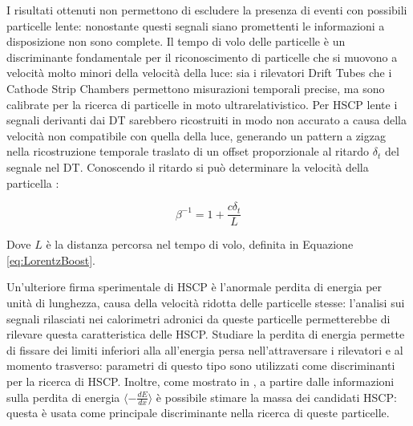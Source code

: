 
I risultati ottenuti non permettono di escludere la presenza di eventi con possibili particelle lente: nonostante questi segnali siano promettenti le informazioni a disposizione non sono complete. Il tempo di volo delle particelle è un discriminante fondamentale per il riconoscimento di particelle che si muovono a velocità molto minori della velocità della luce: sia i rilevatori Drift Tubes che i Cathode Strip Chambers permettono misurazioni temporali precise, ma sono calibrate per la ricerca di particelle in moto ultrarelativistico. Per HSCP lente i segnali derivanti dai DT sarebbero ricostruiti in modo non accurato a causa della velocità non compatibile con quella della luce, generando un pattern a zigzag nella ricostruzione temporale traslato di un offset proporzionale al ritardo $\delta_t$ del segnale nel DT. Conoscendo il ritardo si può determinare la velocità della particella \cite{CMS-PAS-EXO-16-036}:

\begin{equation}
  \label{eq:Velocity}
  \beta^{-1} = 1 + \frac{c\delta_t}{L}
\end{equation}

Dove $L$ è la distanza percorsa nel tempo di volo, definita in Equazione \ref{eq:LorentzBoost}.

Un'ulteriore firma sperimentale di HSCP è l'anormale perdita di energia per unità di lunghezza, causa della velocità ridotta delle particelle stesse: l'analisi sui segnali rilasciati nei calorimetri adronici da queste particelle permetterebbe di rilevare questa caratteristica delle HSCP. Studiare la perdita di energia permette di fissare dei limiti inferiori alla all'energia persa nell'attraversare i rilevatori e al momento trasverso: parametri di questo tipo sono utilizzati come discriminanti per la ricerca di HSCP. Inoltre, come mostrato in \cite{CMS-PAS-EXO-16-036}, a partire dalle informazioni sulla perdita di energia $\langle -\frac{dE}{dx}\rangle$ è possibile stimare la massa dei candidati HSCP: questa è usata come principale discriminante nella ricerca di queste particelle.

